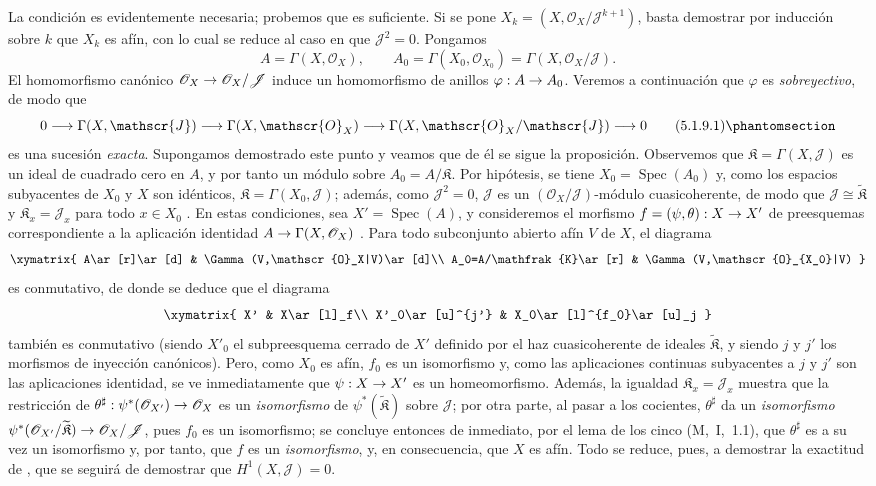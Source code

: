 \documentclass[oneside]{amsart}
\theoremstyle{ega-env-style}
\theoremstyle{ega-thm-env-style}
\theoremstyle{ega-defn-env-style}
\renewcommand{\to}{\mathchoice{\longrightarrow}{\rightarrow}{\rightarrow}{\rightarrow}}
\newcommand{\oldpage}[2][]{{\marginnote{\normalfont{\textbf{#1}~|~#2}}}\ignorespaces}
\let\EGAOriginalLabel\label
\renewcommand{\label}[1]{\phantomsection\EGAOriginalLabel{#1}}
\begin{document}
La condición es evidentemente necesaria; probemos que es suficiente.
Si se pone $X_k=(X,\mathscr{O}_X/\mathscr{J}^{k+1})$, basta demostrar por inducción sobre $k$ que $X_k$ es afín, con lo cual se reduce al caso en que $\mathscr{J}^2=0$.
Pongamos
\[
  A=\Gamma(X,\mathscr{O}_X),\qquad
  A_0=\Gamma(X_0,\mathscr{O}_{X_0})
      =\Gamma(X,\mathscr{O}_X/\mathscr{J}).
\]
El homomorfismo canónico $\mathscr{O}_X\to\mathscr{O}_X/\mathscr{J}$ induce un homomorfismo de anillos $\varphi:A\to A_0$.
Veremos a continuación que $\varphi$ es \emph{sobreyectivo}, de modo que
\[
  0\to\Gamma(X,\mathscr{J})\to\Gamma(X,\mathscr{O}_X)
  \to\Gamma(X,\mathscr{O}_X/\mathscr{J})\to 0
  \tag{5.1.9.1}\label{I.5.1.9.1-fr}
\]
es una sucesión \emph{exacta}.
Supongamos demostrado este punto y veamos que de él se sigue la proposición.
Observemos que $\mathfrak{K}=\Gamma(X,\mathscr{J})$ es un ideal de cuadrado cero en $A$, y por tanto un módulo sobre $A_0=A/\mathfrak{K}$.
Por hipótesis, se tiene $X_0=\operatorname{Spec}(A_0)$ y, como los espacios subyacentes de $X_0$ y $X$ son idénticos, $\mathfrak{K}=\Gamma(X_0,\mathscr{J})$;
además, como $\mathscr{J}^2=0$, $\mathscr{J}$ es un $(\mathscr{O}_X/\mathscr{J})$-módulo cuasicoherente, de modo que $\mathscr{J}\cong\widetilde{\mathfrak{K}}$ y $\mathfrak{K}_x=\mathscr{J}_x$ para todo $x\in X_0$ .
En estas condiciones, sea $X'=\operatorname{Spec}(A)$, y consideremos el morfismo $f=(\psi,\theta):X\to X'$ de preesquemas correspondiente a la aplicación identidad $A\to\Gamma(X,\mathscr{O}_X)$ .
Para todo subconjunto abierto afín $V$ de $X$, el diagrama
\[
  \xymatrix{
    A\ar[r]\ar[d] & \Gamma(V,\mathscr{O}_X|V)\ar[d]\\
    A_0=A/\mathfrak{K}\ar[r] & \Gamma(V,\mathscr{O}_{X_0}|V)
  }
\]
es conmutativo, de donde se deduce que el diagrama
\[
  \xymatrix{
    X' & X\ar[l]_f\\
    X'_0\ar[u]^{j'} & X_0\ar[l]^{f_0}\ar[u]_j
  }
\]
también es conmutativo (siendo $X'_0$ el subpreesquema cerrado de $X'$ definido por el haz cuasicoherente de ideales $\widetilde{\mathfrak{K}}$, y siendo $j$ y $j'$ los morfismos de inyección canónicos).
Pero, como $X_0$ es afín, $f_0$ es un isomorfismo y, como las aplicaciones continuas subyacentes a $j$ y $j'$ son las aplicaciones identidad, se ve inmediatamente que $\psi:X\to X'$ es un homeomorfismo.
Además, la igualdad $\mathfrak{K}_x=\mathscr{J}_x$ muestra que la restricción de $\theta^\sharp:\psi^*(\mathscr{O}_{X'})\to\mathscr{O}_X$ es un \emph{isomorfismo} de $\psi^*(\widetilde{\mathfrak{K}})$ sobre $\mathscr{J}$;
por otra parte, al pasar a los cocientes, $\theta^\sharp$ da un \emph{isomorfismo} $\psi^*(\mathscr{O}_{X'}/\widetilde{\mathfrak{K}})
\to\mathscr{O}_X/\mathscr{J}$, pues $f_0$ es un isomorfismo;
se concluye entonces de inmediato, por el lema de los cinco (M,~I,~1.1), que $\theta^\sharp$ es a su vez un isomorfismo y, por tanto, que $f$ es un \emph{isomorfismo}, y, en consecuencia, que $X$ es afín.
Todo se reduce, pues, a demostrar la exactitud de , que se seguirá de demostrar que 
\oldpage[I]{131}
$H^1(X,\mathscr{J})=0$.
\end{document}

